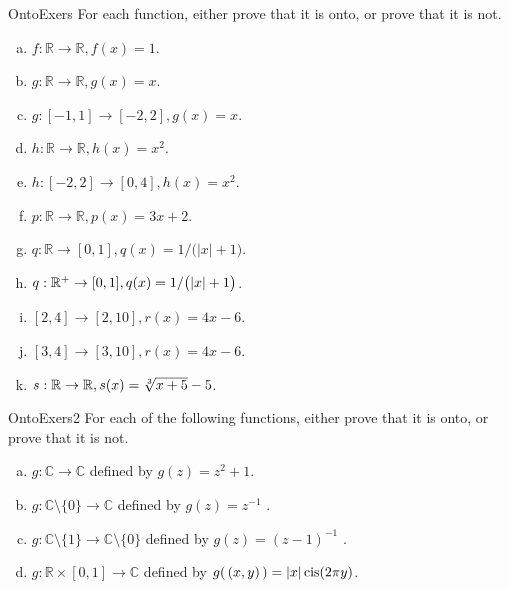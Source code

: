\begin{exercise}{OntoExers} 
For each function, either prove that it is onto, or prove that it is not.
\begin{multicols}{2}
\begin{enumerate}[(a)]
\item \label{OntoExers-formula-a(x)}
 $f: \mathbb{R} \rightarrow \mathbb{R}, f(x) = 1$.
\item \label{OntoExers-formula-b(x)}
 $g: \mathbb{R} \rightarrow \mathbb{R}, g(x) = x$.
\item \label{OntoExers-formula-b(x)2}
 $g: [-1,1] \rightarrow [-2,2], g(x) = x$.
\item \label{OntoExers-formula-c(x)}
 $h: \mathbb{R} \rightarrow \mathbb{R}, h(x) = x^2$.
\item \label{OntoExers-formula-c(x)2}
 $h: [-2,2] \rightarrow [0,4], h(x) = x^2$.
\item \label{OntoExers-formula-p(x)}
 $p: \mathbb{R} \rightarrow \mathbb{R}, p(x) = 3x + 2$.
\item \label{OntoExers-formula-q(x)}
 $q: \mathbb{R} \rightarrow [0,1], q(x) = 1/ \bigl( |x| + 1 \bigr)$.
\item \label{OntoExers-formula-q(x)2}
 $q: \mathbb{R}^+ \rightarrow [0,1], \\q(x) = 1/ \bigl( |x| + 1 \bigr)$.
\item \label{OntoExers-formula-r(x)}
 $[2,4] \rightarrow [2,10], r(x) = 4x - 6$.
\item \label{OntoExers-formula-r(x)2}
 $[3,4] \rightarrow [3,10], r(x) = 4x - 6$.
\item \label{OntoExers-formula-s(x)}
 $s: \mathbb{R} \rightarrow \mathbb{R}, s(x) = \root 3 \of {x+5} - 5$.
\end{enumerate}
\end{multicols}
\end{exercise}


\begin{exercise}{OntoExers2}
For each of the following  functions, either prove that it is onto, or prove that it is not.
\begin{enumerate}[(a)]
\item
 $g \colon {\mathbb C}  \to {\mathbb C} $ defined by $g(z) =  z^2+1$.
\item
 $g \colon {\mathbb C}\setminus \{0\}  \to {\mathbb C} $ defined by $g(z) =  z^{-1}$ .
\item
 $g \colon {\mathbb C}\setminus \{1\}  \to {\mathbb C}\setminus \{0\} $ defined by $g(z) =  (z-1)^{-1}$ .
\item
 $g \colon {\mathbb R} \times [0,1]  \to {\mathbb C} $ defined by $g(\,(x,y)\,) =  |x| \operatorname{cis} ( 2\pi y)$.
\end{enumerate}
\end{exercise}


